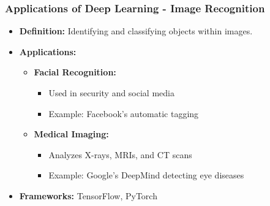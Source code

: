\documentclass{beamer}
\begin{document}
\begin{frame}[fragile]
    \frametitle{Applications of Deep Learning - Image Recognition}
    \begin{itemize}
        \item \textbf{Definition:} Identifying and classifying objects within images.
        \item \textbf{Applications:}
        \begin{itemize}
            \item \textbf{Facial Recognition:} 
                \begin{itemize}
                    \item Used in security and social media
                    \item Example: Facebook's automatic tagging
                \end{itemize}
            \item \textbf{Medical Imaging:} 
                \begin{itemize}
                    \item Analyzes X-rays, MRIs, and CT scans
                    \item Example: Google's DeepMind detecting eye diseases
                \end{itemize}
        \end{itemize}
        \item \textbf{Frameworks:} TensorFlow, PyTorch
    \end{itemize}
\end{frame}
\end{document}
